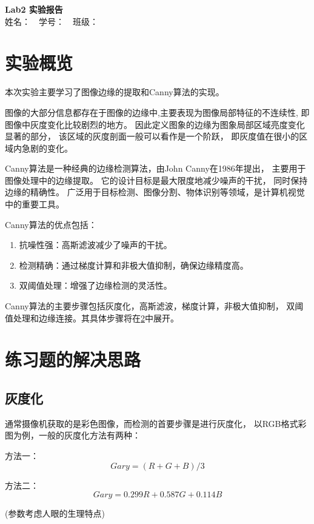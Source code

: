 \documentclass{article}
\begin{document}
\begin{center}
    \Large \textbf{Lab2 实验报告}\\
    \vspace{1em}
    姓名：~~学号：~~班级：
\end{center}

\section{实验概览}
    本次实验主要学习了图像边缘的提取和Canny算法的实现。


    图像的大部分信息都存在于图像的边缘中,主要表现为图像局部特征的不连续性,
    即图像中灰度变化比较剧烈的地方。
    因此定义图象的边缘为图象局部区域亮度变化显著的部分，
    该区域的灰度剖面一般可以看作是一个阶跃，
    即灰度值在很小的区域内急剧的变化。


    Canny算法是一种经典的边缘检测算法，由John Canny在1986年提出，
    主要用于图像处理中的边缘提取。
    它的设计目标是最大限度地减少噪声的干扰，
    同时保持边缘的精确性。
    广泛用于目标检测、图像分割、物体识别等领域，是计算机视觉中的重要工具。

    Canny算法的优点包括：
\begin{enumerate}
\item 抗噪性强：高斯滤波减少了噪声的干扰。
\item 检测精确：通过梯度计算和非极大值抑制，确保边缘精度高。
\item 双阈值处理：增强了边缘检测的灵活性。
\end{enumerate}

    Canny算法的主要步骤包括灰度化，高斯滤波，梯度计算，非极大值抑制，
    双阈值处理和边缘连接。其具体步骤将在\ref{section2}中展开。

\section{练习题的解决思路}\label{section2}
\subsection{灰度化}

    通常摄像机获取的是彩色图像，而检测的首要步骤是进行灰度化，
    以RGB格式彩图为例，一般的灰度化方法有两种：

    方法一：
    \[Gary = (R + G + B) / 3\]

\newpage

    方法二：
    \[Gary = 0.299R + 0.587G + 0.114B\]
\begin{center}
(参数考虑人眼的生理特点)
\end{center}
\end{document}
